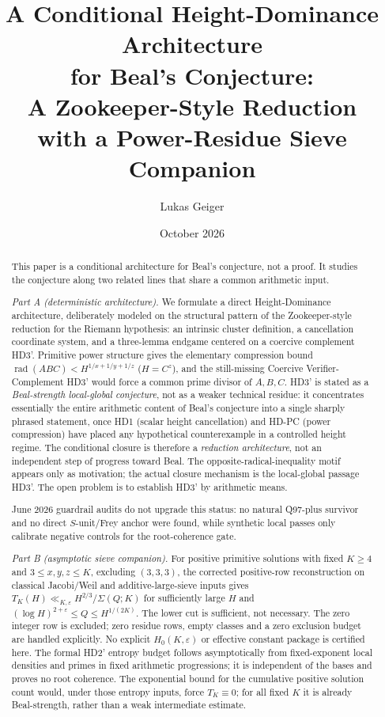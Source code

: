 \documentclass[11pt,a4paper]{article}
\title{A Conditional Height-Dominance Architecture\\
for Beal's Conjecture:\\
A Zookeeper-Style Reduction\\
with a Power-Residue Sieve Companion}
\author{Lukas Geiger}
\date{October 2026}
\DeclareMathOperator{\rad}{rad}
\begin{document}
\maketitle

\begin{abstract}
This paper is a conditional architecture for Beal's conjecture, not a
proof. It studies the conjecture along two related lines that share a
common arithmetic input.

\emph{Part A (deterministic architecture).}
We formulate a direct Height-Dominance architecture, deliberately
modeled on the structural pattern of the Zookeeper-style reduction for the
Riemann hypothesis: an intrinsic cluster definition, a cancellation
coordinate system, and a three-lemma endgame centered on a coercive
complement HD3'. Primitive power structure gives the elementary
compression bound $\rad(ABC) < H^{1/x+1/y+1/z}$ ($H=C^z$),
and the still-missing Coercive Verifier-Complement HD3' would force a
common prime divisor of $A,B,C$. HD3' is stated as a
\emph{Beal-strength local-global conjecture}, not as a weaker
technical residue: it concentrates essentially the entire arithmetic
content of Beal's conjecture into a single sharply phrased statement,
once HD1 (scalar height cancellation) and HD-PC (power compression)
have placed any hypothetical counterexample in a controlled height
regime. The conditional closure is therefore a \emph{reduction
architecture}, not an independent step of progress toward Beal. The
opposite-radical-inequality motif appears only as motivation; the
actual closure mechanism is the local-global passage HD3'. The open
problem is to establish HD3' by arithmetic means.

June 2026 guardrail audits do not upgrade this status: no natural
Q97-plus survivor and no direct $S$-unit/Frey anchor were found, while
synthetic local passes only calibrate negative controls for the
root-coherence gate.

\emph{Part B (asymptotic sieve companion).}
For positive primitive solutions with fixed $K\ge4$ and $3\le x,y,z\le K$,
excluding $(3,3,3)$, the corrected positive-row reconstruction on
classical Jacobi/Weil and additive-large-sieve inputs gives
$T_K(H)\ll_{K,\varepsilon}H^{2/3}/\Sigma(Q;K)$ for sufficiently large $H$
and $(\log H)^{2+\varepsilon}\le Q\le H^{1/(2K)}$.
The lower cut is sufficient, not necessary. The zero integer row is
excluded; zero residue rows, empty classes and a zero exclusion budget
are handled explicitly. No explicit $H_0(K,\varepsilon)$ or effective
constant package is certified here.
The formal HD2' entropy budget follows asymptotically from fixed-exponent
local densities and primes in fixed arithmetic progressions; it is
independent of the bases and proves no root coherence.
The exponential bound for the cumulative positive solution count would,
under those entropy inputs, force $T_K\equiv0$; for all fixed $K$ it is
already Beal-strength, rather than a weak intermediate estimate.


\end{abstract}
\end{document}

